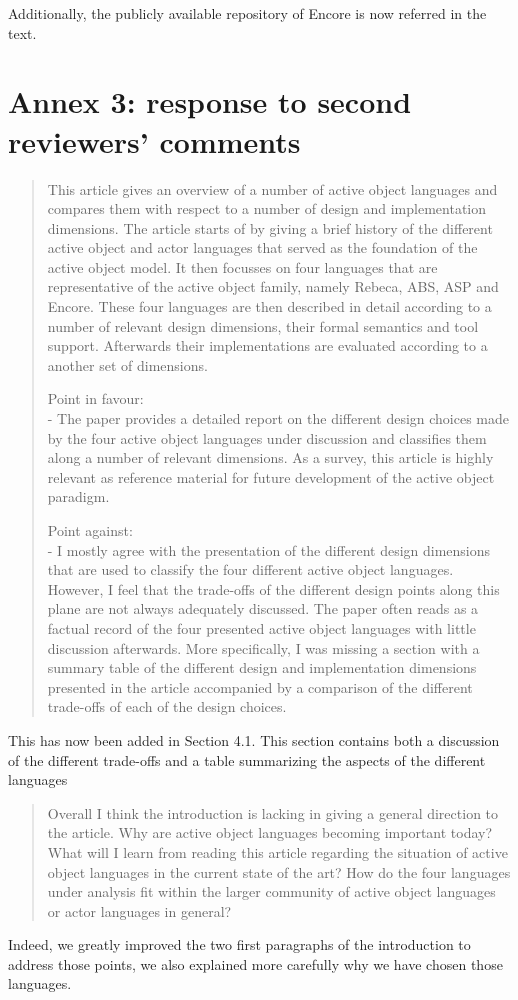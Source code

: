 \documentclass{article}
\begin{document}
Additionally,  the publicly available repository of Encore is now referred in the 
text.

\section*{Annex 3: response to second reviewers' comments}


\begin{quote}
	This article gives an overview of a number of active object languages and compares 
	them 
with respect to a number of design and implementation dimensions. The article starts of 
by giving a brief history of the different active object and actor languages that served 
as the foundation of the active object model. It then focusses on four languages that are 
representative of the active object family, namely Rebeca, ABS, ASP and Encore. These 
four languages are then described in detail according to a number of relevant design 
dimensions, their formal semantics and tool support. Afterwards their implementations are 
evaluated according to a another set of dimensions. 


Point in favour:\\
- The paper provides a detailed report on the different design choices made by the four 
active object languages under discussion and classifies them along a number of relevant 
dimensions. As a survey, this article is highly relevant as reference material for future 
development of the active object paradigm.

Point against:\\
- I mostly agree with the presentation of the different design dimensions that are used 
to classify the four different active object languages. However, I feel that the 
trade-offs of the different design points along this plane are not always adequately 
discussed. The paper often reads as a factual record of the four presented active object 
languages with little discussion afterwards. More specifically, I was missing a section 
with a summary table of the different design and implementation dimensions presented in 
the article accompanied by a comparison of the different trade-offs of each of the design 
choices.
\end{quote}
This has now been added in Section 4.1. This section contains both a discussion of the 
different trade-offs and a table summarizing the aspects of the different languages

\begin{quote}
	Overall I think the introduction is lacking in giving a general direction to the 
article. Why are active object languages becoming important today? What will I learn from 
reading this article regarding the situation of active object languages in the current 
state of the art? How do the four languages under analysis fit within the larger 
community of active object languages or actor languages in general?
\end{quote}
Indeed, we greatly improved the two first paragraphs of the introduction to address those 
points, we also explained more carefully why we have chosen those languages.
\end{document}
